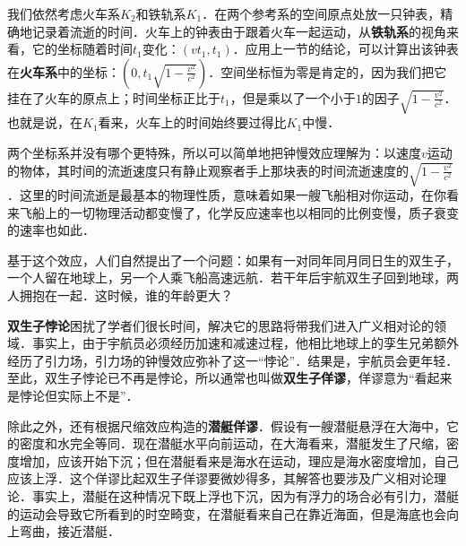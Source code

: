 我们依然考虑火车系$K_2$和铁轨系$K_1$．在两个参考系的空间原点处放一只钟表，精确地记录着流逝的时间．火车上的钟表由于跟着火车一起运动，从\textbf{铁轨系}的视角来看，它的坐标随着时间$t_1$变化：$(vt_1, t_1)$．应用上一节的结论，可以计算出该钟表在\textbf{火车系}中的坐标：$(0, t_1\sqrt{1-\frac{v^2}{c^2}})$．空间坐标恒为零是肯定的，因为我们把它挂在了火车的原点上；时间坐标正比于$t_1$，但是乘以了一个小于$1$的因子$\sqrt{1-\frac{v^2}{c^2}}$．也就是说，在$K_1$看来，火车上的时间始终要过得比$K_1$中慢．

两个坐标系并没有哪个更特殊，所以可以简单地把钟慢效应理解为：以速度$v$运动的物体，其时间的流逝速度只有静止观察者手上那块表的时间流逝速度的$\sqrt{1-\frac{v^2}{c^2}}$．这里的时间流逝是最基本的物理性质，意味着如果一艘飞船相对你运动，在你看来飞船上的一切物理活动都变慢了，化学反应速率也以相同的比例变慢，质子衰变的速率也如此．

基于这个效应，人们自然提出了一个问题：如果有一对同年同月同日生的双生子，一个人留在地球上，另一个人乘飞船高速远航．若干年后宇航双生子回到地球，两人拥抱在一起．这时候，谁的年龄更大？

\textbf{双生子悖论}困扰了学者们很长时间，解决它的思路将带我们进入广义相对论的领域．事实上，由于宇航员必须经历加速和减速过程，他相比地球上的孪生兄弟额外经历了引力场，引力场的钟慢效应弥补了这一“悖论”．结果是，宇航员会更年轻．至此，双生子悖论已不再是悖论，所以通常也叫做\textbf{双生子佯谬}，佯谬意为“看起来是悖论但实际上不是”．

除此之外，还有根据尺缩效应构造的\textbf{潜艇佯谬}．假设有一艘潜艇悬浮在大海中，它的密度和水完全等同．现在潜艇水平向前运动，在大海看来，潜艇发生了尺缩，密度增加，应该开始下沉；但在潜艇看来是海水在运动，理应是海水密度增加，自己应该上浮．这个佯谬比起双生子佯谬要微妙得多，其解答也要涉及广义相对论理论．事实上，潜艇在这种情况下既上浮也下沉，因为有浮力的场合必有引力，潜艇的运动会导致它所看到的时空畸变，在潜艇看来自己在靠近海面，但是海底也会向上弯曲，接近潜艇．
